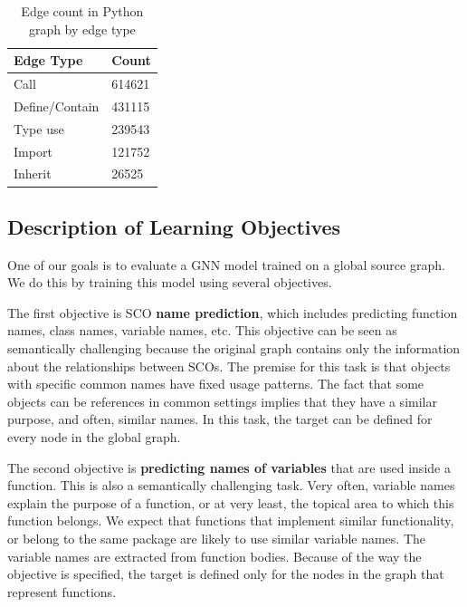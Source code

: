 \documentclass[a4paper,twoside]{article}
\begin{document}
\begin{table}[]
\centering
\begin{tabular}{ll}
\toprule
Edge Type       & Count \\ \midrule
Call            & 614621 \\ \midrule
Define/Contain  & 431115 \\ \midrule
Type use        & 239543 \\ \midrule
Import          & 121752 \\ \midrule
Inherit         & 26525 \\ \bottomrule
\end{tabular}
\caption{Edge count in Python graph by edge type\label{tbl:python_edge_count}}
\end{table}

\subsection{Description of Learning Objectives}

One of our goals is to evaluate a GNN model trained on a global source graph. We do this by training this model using several objectives.

The first objective is SCO \textbf{name prediction}, which includes predicting function names, class names, variable names, etc. This objective can be seen as semantically challenging because the original graph contains only the information about the relationships between SCOs. The premise for this task is that objects with specific common names have fixed usage patterns. The fact that some objects can be references in common settings implies that they have a similar purpose, and often, similar names. In this task, the target can be defined for every node in the global graph.

The second objective is \textbf{predicting names of variables} that are used inside a function. This is also a semantically challenging task. Very often, variable names explain the purpose of a function, or at very least, the topical area to which this function belongs. We expect that functions that implement similar functionality, or belong to the same package are likely to use similar variable names. The variable names are extracted from function bodies. Because of the way the objective is specified, the target is defined only for the nodes in the graph that represent functions.  
\end{document}
